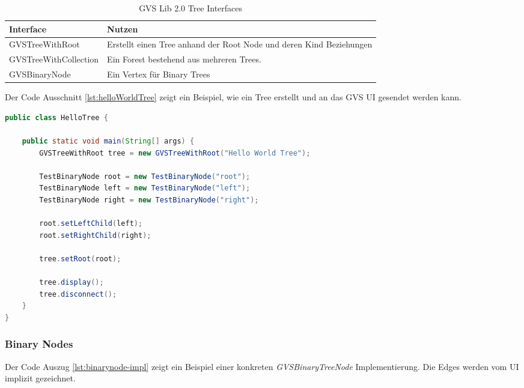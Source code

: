 \documentclass[11pt,a4paper,english,oneside]{book}
\numberwithin{equation}{chapter}
\begin{document}
	\begin{table}[h!]
		\centering
		\begin{tabularx}{\linewidth}{l X}
			\toprule 
			Interface & Nutzen \\
			\midrule
			GVSTreeWithRoot & Erstellt einen Tree anhand der Root Node und deren Kind Beziehungen \\
			GVSTreeWithCollection & Ein Forest bestehend aus mehreren Trees.  \\
			GVSBinaryNode & Ein Vertex für Binary Trees \\
			\bottomrule 
		\end{tabularx} 
		\caption{GVS Lib 2.0 Tree Interfaces} 
		\label{tbl:tree-interfaces}
	\end{table}
	
	\noindent
	Der Code Ausschnitt \ref{lst:helloWorldTree} zeigt ein Beispiel, wie ein Tree erstellt und an das GVS UI gesendet werden kann.
	
\begin{lstlisting}[language=java, frame=single, caption={Hello World Tree}, label={lst:helloWorldTree}]
public class HelloTree {
	
	public static void main(String[] args) {
		GVSTreeWithRoot tree = new GVSTreeWithRoot("Hello World Tree");
		
		TestBinaryNode root = new TestBinaryNode("root");
		TestBinaryNode left = new TestBinaryNode("left");
		TestBinaryNode right = new TestBinaryNode("right");
		
		root.setLeftChild(left);
		root.setRightChild(right);
		
		tree.setRoot(root);
		
		tree.display();
		tree.disconnect();
	}
}

\end{lstlisting}

\clearpage

	\subsubsection{Binary Nodes}
	Der Code Auszug \ref{lst:binarynode-impl} zeigt ein Beispiel einer konkreten \textit{GVSBinaryTreeNode} Implementierung. Die Edges werden vom UI implizit gezeichnet.
\end{document}
